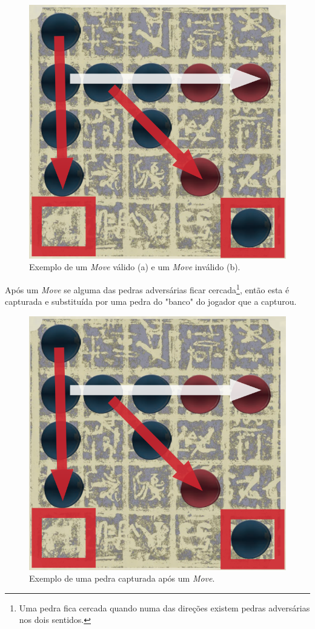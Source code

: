 \documentclass[a4paper]{article}
\begin{document}
\begin{figure}[!htb]
	\centering
	\includegraphics[scale=0.3]{push2.png} 
	\caption{Exemplo de um \textit{Move} válido (a) e um \textit{Move} inválido (b).}
\end{figure}

Após um \textit{Move} se alguma das pedras adversárias ficar cercada\footnote{Uma pedra fica cercada quando numa das direções existem pedras adversárias nos dois sentidos.}, então esta é capturada e substituída por uma pedra do "banco" do jogador que a capturou.

\begin{figure}[!htb]
	\centering
	\includegraphics[scale=0.3]{push2.png} 
	\caption{Exemplo de uma pedra capturada após um \textit{Move}.}
\end{figure}
\end{document}

